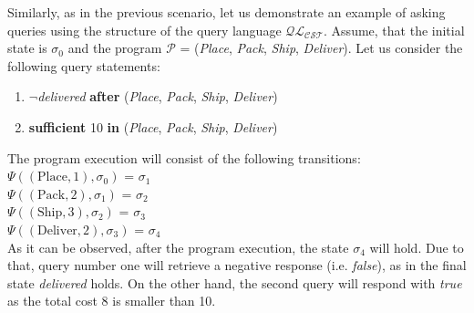 \documentclass[a4paper]{article}
\begin{document}
Similarly, as in the previous scenario, let us demonstrate an example of asking queries using the structure of the query language $\mathcal{QL_{CST}}$. Assume, that the initial state is $\sigma_0$ and the program $\mathcal{P}$ = (\textit{Place}, \textit{Pack}, \textit{Ship}, \textit{Deliver}). Let us consider the following query statements:
\begin{enumerate}
    \item $\neg$\textit{delivered} \textbf{after} (\textit{Place}, \textit{Pack}, \textit{Ship}, \textit{Deliver})
    \item \textbf{sufficient} 10 \textbf{in} (\textit{Place}, \textit{Pack}, \textit{Ship}, \textit{Deliver})
\end{enumerate}
The program execution will consist of the following transitions: \\[0.5\baselineskip]
$\Psi((\text{Place},1),\sigma_0)$ = $\sigma_1$ \\[0.1\baselineskip]
$\Psi((\text{Pack},2),\sigma_1)$ = $\sigma_2$ \\[0.1\baselineskip]
$\Psi((\text{Ship},3),\sigma_2)$ = $\sigma_3$ \\[0.1\baselineskip]
$\Psi((\text{Deliver},2),\sigma_3)$ = $\sigma_4$ \\[0.7\baselineskip]
As it can be observed, after the program execution, the state $\sigma_4$ will hold. Due to that, query number one will retrieve a negative response (i.e. \textit{false}), as in the final state \textit{delivered} holds. On the other hand, the second query will respond with \textit{true} as the total cost 8 is smaller than 10.
\end{document}

